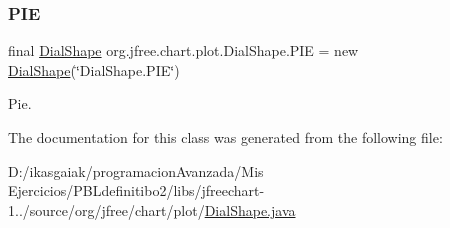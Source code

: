 \subsubsection{\texorpdfstring{P\+IE}{PIE}}
{\footnotesize\ttfamily final \mbox{\hyperlink{classorg_1_1jfree_1_1chart_1_1plot_1_1_dial_shape}{Dial\+Shape}} org.\+jfree.\+chart.\+plot.\+Dial\+Shape.\+P\+IE = new \mbox{\hyperlink{classorg_1_1jfree_1_1chart_1_1plot_1_1_dial_shape}{Dial\+Shape}}(\char`\"{}Dial\+Shape.\+P\+IE\char`\"{})\hspace{0.3cm}{\ttfamily [static]}}

Pie. 

The documentation for this class was generated from the following file\+:\begin{DoxyCompactItemize}
\item 
D\+:/ikasgaiak/programacion\+Avanzada/\+Mis Ejercicios/\+P\+B\+Ldefinitibo2/libs/jfreechart-\/1../source/org/jfree/chart/plot/\mbox{\hyperlink{_dial_shape_8java}{Dial\+Shape.\+java}}\end{DoxyCompactItemize}
